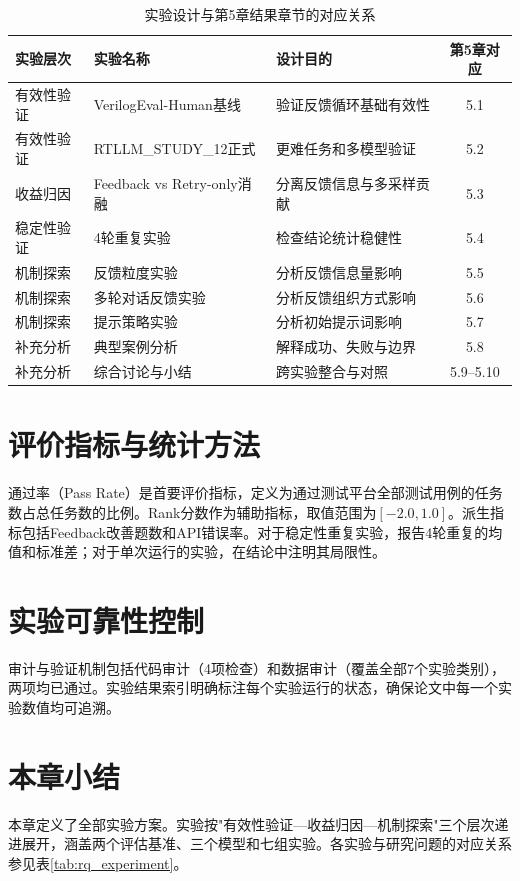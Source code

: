 \begin{table}[htbp]
\centering
\caption{实验设计与第5章结果章节的对应关系}
\label{tab:design_results_map}
\begin{tabular}{p{2.6cm}p{3.6cm}p{4.4cm}c}
\toprule
实验层次 & 实验名称 & 设计目的 & 第5章对应 \\
\midrule
有效性验证 & VerilogEval-Human基线 & 验证反馈循环基础有效性 & 5.1 \\
有效性验证 & RTLLM\_STUDY\_12正式 & 更难任务和多模型验证 & 5.2 \\
\midrule
收益归因 & Feedback vs Retry-only消融 & 分离反馈信息与多采样贡献 & 5.3 \\
稳定性验证 & 4轮重复实验 & 检查结论统计稳健性 & 5.4 \\
\midrule
机制探索 & 反馈粒度实验 & 分析反馈信息量影响 & 5.5 \\
机制探索 & 多轮对话反馈实验 & 分析反馈组织方式影响 & 5.6 \\
机制探索 & 提示策略实验 & 分析初始提示词影响 & 5.7 \\
\midrule
补充分析 & 典型案例分析 & 解释成功、失败与边界 & 5.8 \\
补充分析 & 综合讨论与小结 & 跨实验整合与对照 & 5.9--5.10 \\
\bottomrule
\end{tabular}
\end{table}

\section{评价指标与统计方法}

通过率（Pass Rate）是首要评价指标，定义为通过测试平台全部测试用例的任务数占总任务数的比例。Rank分数作为辅助指标，取值范围为$[-2.0, 1.0]$。派生指标包括Feedback改善题数和API错误率。对于稳定性重复实验，报告4轮重复的均值和标准差；对于单次运行的实验，在结论中注明其局限性。

\section{实验可靠性控制}

审计与验证机制包括代码审计（4项检查）和数据审计（覆盖全部7个实验类别），两项均已通过。实验结果索引明确标注每个实验运行的状态，确保论文中每一个实验数值均可追溯。

\section{本章小结}

本章定义了全部实验方案。实验按"有效性验证—收益归因—机制探索"三个层次递进展开，涵盖两个评估基准、三个模型和七组实验。各实验与研究问题的对应关系参见表\ref{tab:rq_experiment}。
